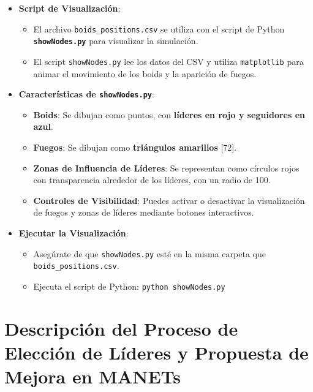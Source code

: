 \documentclass{article}
\begin{document}
\begin{itemize}
    \item \textbf{Script de Visualización}:
    \begin{itemize}
        \item El archivo \texttt{boids\_positions.csv} se utiliza con el script de Python \textbf{\texttt{showNodes.py}} para visualizar la simulación.
        \item El script \texttt{showNodes.py} lee los datos del CSV y utiliza \texttt{matplotlib} para animar el movimiento de los boids y la aparición de fuegos.
    \end{itemize}
    \item \textbf{Características de \texttt{showNodes.py}}:
    \begin{itemize}
        \item \textbf{Boids}: Se dibujan como puntos, con \textbf{líderes en rojo y seguidores en azul}.
        \item \textbf{Fuegos}: Se dibujan como \textbf{triángulos amarillos} [72].
        \item \textbf{Zonas de Influencia de Líderes}: Se representan como círculos rojos con transparencia alrededor de los líderes, con un radio de 100.
        \item \textbf{Controles de Visibilidad}: Puedes activar o desactivar la visualización de fuegos y zonas de líderes mediante botones interactivos.
    \end{itemize}
    \item \textbf{Ejecutar la Visualización}:
    \begin{itemize}
        \item Asegúrate de que \texttt{showNodes.py} esté en la misma carpeta que \texttt{boids\_positions.csv}.
        \item Ejecuta el script de Python: \texttt{python showNodes.py}
    \end{itemize}
\end{itemize}


\section*{Descripción del Proceso de Elección de Líderes y Propuesta de Mejora en MANETs}
\end{document}
